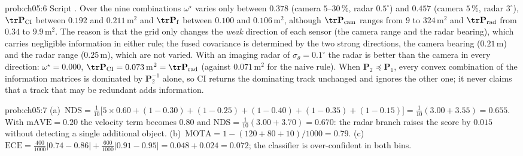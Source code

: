 \begin{sol}{prob:ch05:6}
Script . Over the nine combinations $\omega^{\star}$ varies only between $0.378$ (camera $5$--$30$\,\%, radar $0.5^{\circ}$) and $0.457$ (camera $5$\,\%, radar $3^{\circ}$), $\tr\mathbf{P}_{\mathrm{CI}}$ between $0.192$ and $0.211$\,m$^{2}$ and $\tr\mathbf{P}_{\mathrm{f}}$ between $0.100$ and $0.106$\,m$^{2}$, although $\tr\mathbf{P}_{\mathrm{cam}}$ ranges from $9$ to $324$\,m$^{2}$ and $\tr\mathbf{P}_{\mathrm{rad}}$ from $0.34$ to $9.9$\,m$^{2}$. The reason is that the grid only changes the \emph{weak} direction of each sensor (the camera range and the radar bearing), which carries negligible information in either rule; the fused covariance is determined by the two strong directions, the camera bearing ($0.21$\,m) and the radar range ($0.25$\,m), which are not varied. With an imaging radar of $\sigma_{\theta}=0.1^{\circ}$ the radar is better than the camera in every direction: $\omega^{\star}=0.000$, $\tr\mathbf{P}_{\mathrm{CI}}=0.073$\,m$^{2}=\tr\mathbf{P}_{\mathrm{rad}}$ (against $0.071$\,m$^{2}$ for the naive rule). When $\mathbf{P}_{2}\preceq\mathbf{P}_{1}$, every convex combination of the information matrices is dominated by $\mathbf{P}_{2}^{-1}$ alone, so CI returns the dominating track unchanged and ignores the other one; it never claims that a track that may be redundant adds information.
\end{sol}

\begin{sol}{prob:ch05:7}
(a)~$\mathrm{NDS}=\tfrac{1}{10}\big[5\times0.60+(1-0.30)+(1-0.25)+(1-0.40)+(1-0.35)+(1-0.15)\big]=\tfrac{1}{10}(3.00+3.55)=0.655$. With $\mathrm{mAVE}=0.20$ the velocity term becomes $0.80$ and $\mathrm{NDS}=\tfrac{1}{10}(3.00+3.70)=0.670$: the radar branch raises the score by $0.015$ without detecting a single additional object. (b)~$\mathrm{MOTA}=1-(120+80+10)/1000=0.79$. (c)~$\mathrm{ECE}=\tfrac{400}{1000}|0.74-0.86|+\tfrac{600}{1000}|0.91-0.95|=0.048+0.024=0.072$; the classifier is over-confident in both bins.
\end{sol}


